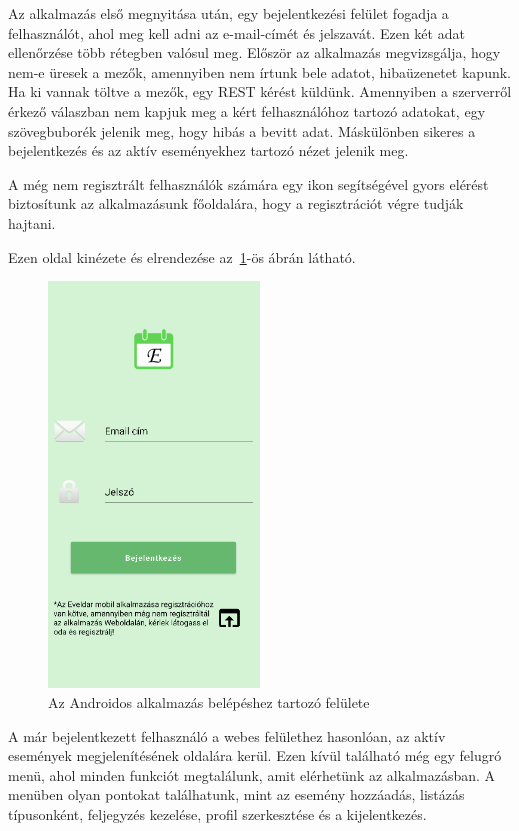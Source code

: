 \documentclass[
]{thesis-ekf}
\theoremstyle{definition}
\theoremstyle{remark}
\begin{document}
	Az alkalmazás első megnyitása után, egy bejelentkezési felület fogadja a felhasználót, ahol meg kell adni az e-mail-címét és jelszavát. Ezen két adat ellenőrzése több rétegben valósul meg. Először az alkalmazás megvizsgálja, hogy nem-e üresek a mezők, amennyiben nem írtunk bele adatot, hibaüzenetet kapunk. Ha ki vannak töltve a mezők, egy REST kérést küldünk. Amennyiben a szerverről érkező válaszban nem kapjuk meg a kért felhasználóhoz tartozó adatokat, egy szövegbuborék jelenik meg, hogy hibás a bevitt adat. Máskülönben sikeres a bejelentkezés és az aktív eseményekhez tartozó nézet jelenik meg.
	
	A még nem regisztrált felhasználók számára egy ikon segítségével gyors elérést biztosítunk az alkalmazásunk főoldalára, hogy a regisztrációt végre tudják hajtani.
	
	Ezen oldal kinézete és elrendezése az~\ref{figure:androidapp_main}-ös ábrán látható.
	
	\begin{figure}[ht!]
		\centering
		\includegraphics[width=0.5\textwidth]{android_app/android_main}
		\caption{Az Androidos alkalmazás belépéshez tartozó felülete}
		\label{figure:androidapp_main}
	\end{figure}
	
	A már bejelentkezett felhasználó a webes felülethez hasonlóan, az aktív események megjelenítésének oldalára kerül. Ezen kívül található még egy felugró menü, ahol minden funkciót megtalálunk, amit elérhetünk az alkalmazásban. A menüben olyan pontokat találhatunk, mint az esemény hozzáadás, listázás típusonként, feljegyzés kezelése, profil szerkesztése és a kijelentkezés. 
	
\end{document}
